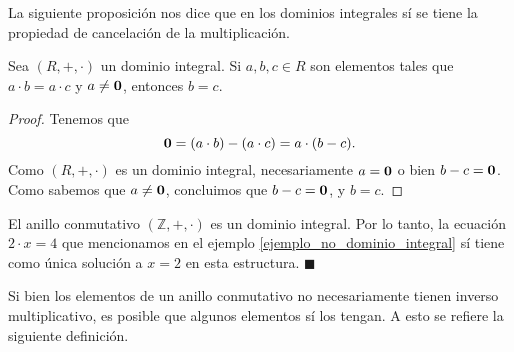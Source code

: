 La siguiente proposición nos dice que en los dominios integrales sí se tiene la propiedad de cancelación de la multiplicación.

\begin{proposition}
Sea $(R, +, \cdot)$ un dominio integral. Si $a, b, c \in R$ son elementos tales que $a \cdot b = a \cdot c$ y $a \neq \mathbf{0}$, entonces $b = c$.
\end{proposition}

\begin{proof}
Tenemos que
$$\mathbf{0} = (a \cdot b) - (a \cdot c) = a \cdot (b-c).$$
Como $(R, +, \cdot)$ es un dominio integral, necesariamente $a = \mathbf{0}$ o bien $b-c = \mathbf{0}$. Como sabemos que $a \neq \mathbf{0}$, concluimos que $b - c = \mathbf{0}$, y $b = c$.
\end{proof}


\begin{example}
El anillo conmutativo $(\mathbb{Z}, +, \cdot)$ es un dominio integral. Por lo tanto, la ecuación $2 \cdot x = 4$ que mencionamos en el ejemplo \ref{ejemplo_no_dominio_integral} sí tiene como única solución a $x = 2$ en esta estructura. 
\hfill$\blacksquare$
\end{example}

Si bien los elementos de un anillo conmutativo no necesariamente tienen inverso multiplicativo, es posible que algunos elementos sí los tengan. A esto se refiere la siguiente definición.

